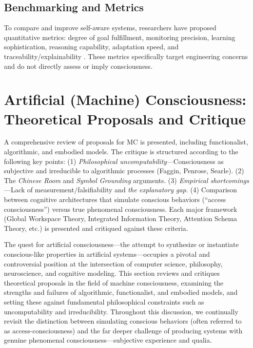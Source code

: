 \subsection{Benchmarking and Metrics}

To compare and improve self-aware systems, researchers have proposed quantitative metrics: degree of goal fulfillment, monitoring precision, learning sophistication, reasoning capability, adaptation speed, and traceability/explainability \cite{herbst2017metrics,lewis2016self}. These metrics specifically target engineering concerns and do not directly assess or imply consciousness.

\section{Artificial (Machine) Consciousness: Theoretical Proposals and Critique}

A comprehensive review of proposals for MC is presented, including functionalist, algorithmic, and embodied models. The critique is structured according to the following key points: (1) \emph{Philosophical uncomputability}---Consciousness as subjective and irreducible to algorithmic processes (Faggin, Penrose, Searle). (2) The \emph{Chinese Room} and \emph{Symbol Grounding} arguments. (3) \emph{Empirical shortcomings}---Lack of measurement/falsifiability and \emph{the explanatory gap}. (4) Comparison between cognitive architectures that simulate conscious behaviors (``access consciousness'') versus true phenomenal consciousness. Each major framework (Global Workspace Theory, Integrated Information Theory, Attention Schema Theory, etc.) is presented and critiqued against these criteria.

The quest for artificial consciousness---the attempt to synthesize or instantiate conscious-like properties in artificial systems---occupies a pivotal and controversial position at the intersection of computer science, philosophy, neuroscience, and cognitive modeling. This section reviews and critiques theoretical proposals in the field of machine consciousness, examining the strengths and failures of algorithmic, functionalist, and embodied models, and setting these against fundamental philosophical constraints such as uncomputability and irreducibility. Throughout this discussion, we continually revisit the distinction between simulating conscious behaviors (often referred to as access-consciousness) and the far deeper challenge of producing systems with genuine phenomenal consciousness---subjective experience and qualia.

